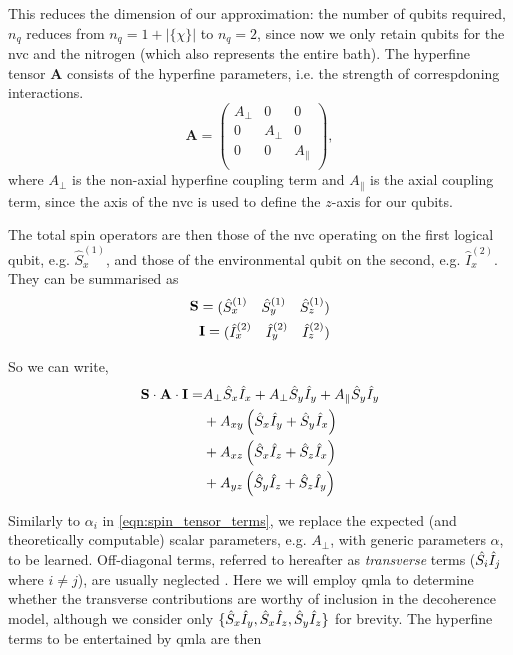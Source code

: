 This reduces the dimension of our approximation: 
    the number of qubits required, $n_q$ 
    reduces from $n_q = 1 + |\{\chi\}|$ to $n_q = 2$, 
    since now we only retain qubits for the \gls{nvc} and the \gls{nitrogen} 
    (which also represents the entire bath).
The hyperfine tensor $\mathbf{A}$ consists of the hyperfine parameters, 
    i.e. the strength of correspdoning interactions. 
\begin{equation}
    \mathbf{A} = 
    \begin{pmatrix}
        A_{\perp} & 0 & 0 \\    
        0 & A_{\perp} & 0 \\
        0 & 0 & A_{\|} \\
    \end{pmatrix},
\end{equation}
    where $A_{\perp}$ is the non-axial hyperfine coupling term and $A_{\|}$ is the axial coupling term, 
    since the axis of the \gls{nvc} is used to define the $z$-axis for our qubits. 

The total spin operators are then those of the \gls{nvc} operating on the first logical qubit, e.g. $\hat{S}^{(1)}_x$,
    and those of the environmental qubit on the second, e.g. $\hat{I}_x^{(2)}$. 
They can be summarised as
\begin{equation}
    \label{total_spin_operators}
    \begin{split}
    \mathbf{S} = \begin{matrix}( \hat{S}_x^{(1)}  & \hat{S}_y^{(1)} & \hat{S}_z^{(1)} )\end{matrix} \\
    \mathbf{I} = \begin{matrix}( \hat{I}_x^{(2)} & \hat{I}_y^{(2)} & \hat{I}_z^{(2)}  )\end{matrix} 
    \end{split}
\end{equation}

So we can write, 
\begin{equation}
    \begin{split}
        \mathbf{S} \cdot \mathbf{A} \cdot \mathbf{I} 
        = &A_{\perp} \hat{S}_x \hat{I}_x + A_{\perp} \hat{S}_y \hat{I}_y + A_{\|} \hat{S}_y \hat{I}_y \\
        &+ A_{xy} \left( \hat{S}_x \hat{I}_y + \hat{S}_y \hat{I}_x \right) \\
        &+ A_{xz} \left( \hat{S}_x \hat{I}_z + \hat{S}_z \hat{I}_x \right) \\
        &+ A_{yz} \left( \hat{S}_y \hat{I}_z + \hat{S}_z \hat{I}_y \right) \\
    \end{split}
\end{equation}

Similarly to $\alpha_i$ in \cref{eqn:spin_tensor_terms}, we replace the expected (and theoretically computable)
    scalar parameters, e.g. $A_{\perp}$, with generic parameters $\alpha$, to be learned.
Off-diagonal terms, referred to hereafter as \emph{transverse} terms ($\hat{S_i}\hat{I}_j$ where $i\neq j$),
    are usually neglected \cite{blok2014manipulating}.
Here we will employ \gls{qmla} to determine whether the transverse contributions are worthy of inclusion in the decoherence model, 
    although we consider only $\{ \hat{S}_x\hat{I}_y, \hat{S}_x\hat{I}_z, \hat{S}_y\hat{I}_z\}$ for brevity. 
The hyperfine terms to be entertained by \gls{qmla} are then

